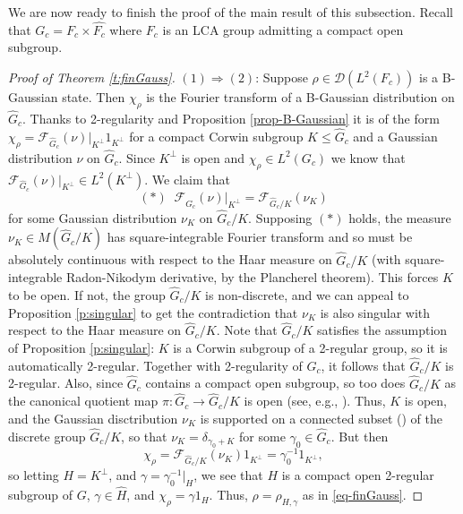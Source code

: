 \documentclass[12pt,reqno]{amsart}
\theoremstyle{definition}
\theoremstyle{definition}
\theoremstyle{definition}
\numberwithin{thm}{section}
\numberwithin{equation}{section}
\newcommand{\D}{\mathcal{D}}
\newcommand{\mc}[1]{\mathcal #1}
\newcommand{\wh}[1]{\widehat{#1}}
\begin{document}
We are now ready to finish the proof of the main result of this subsection. Recall that $G_c = F_c\times\wh{F_c}$ where $F_c$ is an LCA group admitting a compact open subgroup.


\begin{proof}[Proof of Theorem \ref{t:finGauss}] 

$(1)\Rightarrow(2)$: Suppose $\rho\in \D(L^2(F_c))$ is a B-Gaussian state. Then $\chi_\rho$ is the Fourier transform of a B-Gaussian distribution on $\wh{G}_c$. Thanks to 2-regularity and Proposition \ref{prop-B-Gaussian} it is of the form $\chi_\rho = \mc{F}_{\wh{G}_c}(\nu)|_{K^\perp}1_{K^\perp}$
for a compact Corwin subgroup $K\leq\wh{G}_c$ and a Gaussian distribution $\nu$ on $\wh{G}_c$.
Since $K^\perp$ is open and $\chi_\rho\in L^2(G_c)$ we know that $\mc{F}_{\wh{G}_c}(\nu)|_{K^\perp} \in L^2(K^\perp)$. We claim that
    $$(*) \;\; \mc{F}_{\wh{G}_c}(\nu)|_{K^\perp} = \mc{F}_{\wh{G}_c/K}(\nu_K)$$
for some Gaussian distribution $\nu_K$ on $\wh{G}_c/K$. Supposing $(*)$ holds, the measure $\nu_K\in M(\wh{G}_c/K)$ has square-integrable Fourier transform and so must be absolutely continuous with respect to the Haar measure on $\wh{G}_c/K$ (with square-integrable Radon-Nikodym derivative, by the Plancherel theorem). This forces $K$ to be open. If not, the group $\wh{G}_c/K$ is non-discrete, and we can appeal to Proposition \ref{p:singular} to get the contradiction that $\nu_K$ is also singular with respect to the Haar measure on $\wh{G}_c/K$. Note that $\wh{G}_c/K$ satisfies the assumption of Proposition \ref{p:singular}: $K$ is a Corwin subgroup of a 2-regular group, so it is automatically 2-regular. Together with 2-regularity of $\wh{G}_c$, it follows that $\wh{G}_c/K$ is 2-regular. Also, since $\wh{G}_c$ contains a compact open subgroup, so too does $\wh{G}_c/K$ as the canonical quotient map $\pi:\wh{G}_c\rightarrow\wh{G}_c/K$ is open (see, e.g., \cite[5.26]{HewittRoss}). Thus, $K$ is open, and the Gaussian disctribution $\nu_K$ is supported on a connected subset (\cite[Proposition 3.6]{Feldman}) of the discrete group $\wh{G}_c/K$, so that $\nu_K=\delta_{\gamma_0+K}$ for some $\gamma_0\in\wh{G}_c$.
But then  
$$\chi_\rho=\mc{F}_{\wh{G}_c/K}(\nu_K)1_{K^{\perp}}=\gamma_0^{-1}1_{K^{\perp}},$$
so letting $H=K^\perp$, and $\gamma=\gamma_0^{-1}|_{H}$, we see that $H$ is a compact open 2-regular subgroup of $G$, $\gamma\in\wh{H}$, and $\chi_\rho=\gamma1_H$. Thus, $\rho=\rho_{H,\gamma}$ as in \eqref{eq-finGauss}.


\end{proof}
\end{document}
